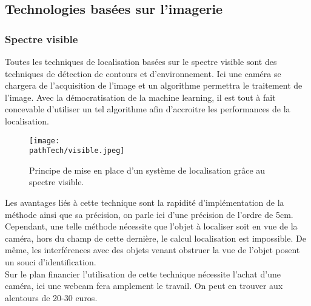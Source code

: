 \subsection{Technologies basées sur l'imagerie}
\subsubsection{Spectre visible}
Toutes les techniques de localisation basées sur le spectre visible sont des techniques de détection de contours et d'environnement. 
Ici une caméra se chargera de l'acquisition de l'image et un algorithme permettra le traitement de l'image.
Avec la démocratisation de la machine learning, il est tout à fait concevable d'utiliser un tel algorithme afin d'accroitre les performances de la localisation.
\begin{figure}[H]
    \centering
    \texttt{[image: \\pathTech/visible.jpeg]}
    \caption{Principe de mise en place d'un système de localisation grâce au spectre visible.}
\end{figure}
Les avantages liés à cette technique sont la rapidité d'implémentation de la méthode ainsi que sa précision, on parle ici d'une précision de l'ordre de 5cm.
\\
Cependant, une telle méthode nécessite que l'objet à localiser soit en vue de la caméra, hors du champ de cette dernière, le calcul localisation est impossible. De même, les interférences avec des objets venant obstruer la vue de l'objet posent un souci d'identification.
\medskip
\\
Sur le plan financier l'utilisation de cette technique nécessite l'achat d'une caméra, ici une webcam fera amplement le travail. On peut en trouver aux alentours de 20-30 euros.
